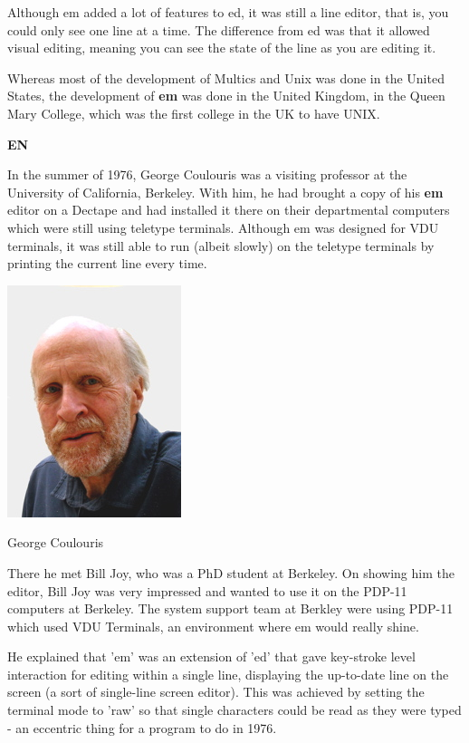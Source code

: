 Although em added a lot of features to ed, it was still
a line editor, that is, you could only see one line at a time.
The difference from ed was that it allowed visual editing,
meaning you can see the state of the line as you are editing it.

Whereas most of the development of Multics and Unix
was done in the United States, the development of \textbf{em}
was done in the United Kingdom, in the Queen Mary College,
which was the first college in the UK to have UNIX.

\textbf{EN}

In the summer of 1976, George Coulouris was a visiting professor
at the University of California, Berkeley.
With him, he had brought a copy of his \textbf{em} editor
on a Dectape
and had installed it there on their departmental computers
which were still using teletype terminals.
Although em was designed for VDU terminals, it was still
able to run (albeit slowly) on the teletype terminals
by printing the current line every time.

\begin{marginfigure}
  \includegraphics{images/png/georgeQMC.png}
  \caption{George Coulouris}
\end{marginfigure}

There he met Bill Joy, who was a PhD student at Berkeley.
On showing him the editor, Bill Joy was very impressed
and wanted to use it on the PDP-11 computers at Berkeley.
The system support team at Berkley were using PDP-11 which
used VDU Terminals, an environment where em would really shine.

He explained that 'em' was an extension of 'ed'
that gave key-stroke level interaction for editing
within a single line, displaying the up-to-date line
on the screen (a sort of single-line screen editor).
This was achieved by setting the terminal mode to 'raw'
so that single characters could be read as they were typed
- an eccentric thing for a program to do in 1976.

